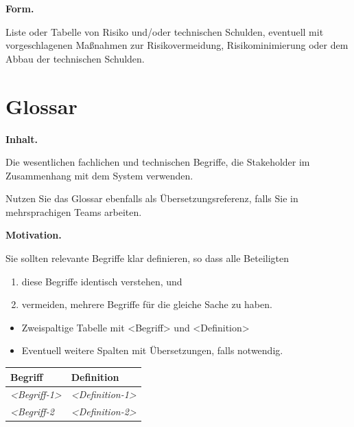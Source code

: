\documentclass[]{article}
\begin{document}
\textbf{Form.}

Liste oder Tabelle von Risiko und/oder technischen Schulden, eventuell
mit vorgeschlagenen Maßnahmen zur Risikovermeidung, Risikominimierung
oder dem Abbau der technischen Schulden.

\section{Glossar}\label{section-glossary}

\textbf{Inhalt.}

Die wesentlichen fachlichen und technischen Begriffe, die Stakeholder im
Zusammenhang mit dem System verwenden.

Nutzen Sie das Glossar ebenfalls als Übersetzungsreferenz, falls Sie in
mehrsprachigen Teams arbeiten.

\textbf{Motivation.}

Sie sollten relevante Begriffe klar definieren, so dass alle Beteiligten

\begin{enumerate}
\def\labelenumi{\arabic{enumi}.}
\item
  diese Begriffe identisch verstehen, und
\item
  vermeiden, mehrere Begriffe für die gleiche Sache zu haben.
\end{enumerate}

\begin{itemize}
\item
  Zweispaltige Tabelle mit \textless{}Begriff\textgreater{} und
  \textless{}Definition\textgreater{}
\item
  Eventuell weitere Spalten mit Übersetzungen, falls notwendig.
\end{itemize}

\begin{longtable}[]{@{}ll@{}}
\toprule
\begin{minipage}[b]{0.31\columnwidth}\raggedright\strut
Begriff\strut
\end{minipage} & \begin{minipage}[b]{0.63\columnwidth}\raggedright\strut
Definition\strut
\end{minipage}\tabularnewline
\midrule
\endhead
\begin{minipage}[t]{0.31\columnwidth}\raggedright\strut
\emph{\textless{}Begriff-1\textgreater{}}\strut
\end{minipage} & \begin{minipage}[t]{0.63\columnwidth}\raggedright\strut
\emph{\textless{}Definition-1\textgreater{}}\strut
\end{minipage}\tabularnewline
\begin{minipage}[t]{0.31\columnwidth}\raggedright\strut
\emph{\textless{}Begriff-2}\strut
\end{minipage} & \begin{minipage}[t]{0.63\columnwidth}\raggedright\strut
\emph{\textless{}Definition-2\textgreater{}}\strut
\end{minipage}\tabularnewline
\bottomrule
\end{longtable}
\end{document}
